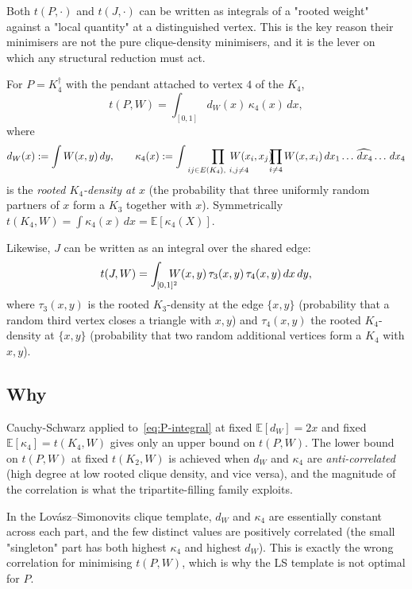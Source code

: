 \documentclass[11pt]{amsart}
\theoremstyle{definition}
\newcommand{\E}{\mathbb E}
\newcommand{\dd}{\,d}
\begin{document}
Both $t(P,\cdot)$ and $t(J,\cdot)$ can be written as integrals of a "rooted
weight" against a "local quantity" at a distinguished vertex.  This is the key
reason their minimisers are not the pure clique-density minimisers, and it is
the lever on which any structural reduction must act.

For $P = K_4^{\dagger}$ with the pendant attached to vertex $4$ of the $K_4$,
\begin{equation}
\label{eq:P-integral}
   t(P,W)
   = \int_{[0,1]} d_W(x)\,\kappa_4(x)\dd x,
\end{equation}
where
\[
   d_W(x) := \int W(x,y)\dd y,\qquad
   \kappa_4(x) := \int \prod_{ij\in E(K_4),\ i,j\ne 4}\hspace{-2em} W(x_i,x_j)\hspace{-0.5em}
   \prod_{i\ne 4} W(x,x_i)\dd x_1\dots\widehat{\dd x_4}\dots\dd x_4
\]
is the \emph{rooted $K_4$-density at $x$} (the probability that three uniformly
random partners of $x$ form a $K_3$ together with $x$).  Symmetrically
$t(K_4,W) = \int\kappa_4(x)\dd x = \E[\kappa_4(X)]$.

Likewise, $J$ can be written as an integral over the shared edge:
\begin{equation}
\label{eq:J-integral}
   t(J,W) = \int_{[0,1]^2}\hspace{-1em} W(x,y)\,\tau_3(x,y)\,\tau_4(x,y)\dd x\dd y,
\end{equation}
where $\tau_3(x,y)$ is the rooted $K_3$-density at the edge $\{x,y\}$ (probability that a
random third vertex closes a triangle with $x,y$) and $\tau_4(x,y)$ the rooted
$K_4$-density at $\{x,y\}$ (probability that two random additional vertices
form a $K_4$ with $x,y$).

\subsection{Why }

Cauchy-Schwarz applied to~\eqref{eq:P-integral} at fixed
$\E[d_W]=2x$ and fixed $\E[\kappa_4]=t(K_4,W)$ gives only an upper bound on
$t(P,W)$.  The lower bound on $t(P,W)$ at fixed $t(K_2,W)$ is achieved when
$d_W$ and $\kappa_4$ are \emph{anti-correlated} (high degree at low rooted
clique density, and vice versa), and the magnitude of the correlation is what
the tripartite-filling family exploits.

In the Lovász--Simonovits clique template, $d_W$ and $\kappa_4$ are essentially
constant across each part, and the few distinct values are positively
correlated (the small "singleton" part has both highest $\kappa_4$ and highest
$d_W$).  This is exactly the wrong correlation for minimising $t(P,W)$, which
is why the LS template is not optimal for $P$.
\end{document}
